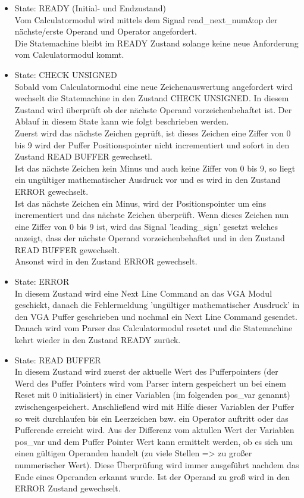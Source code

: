 \begin{itemize}

\item State: READY (Initial- und Endzustand) \\
Vom Calculatormodul wird mittels dem Signal read\_next\_num\&op der nächste/erste Operand und Operator angefordert. \\ 
Die Statemachine bleibt im READY Zustand solange keine neue Anforderung vom Calculatormodul kommt.

\item State: CHECK UNSIGNED \\
Sobald vom Calculatormodul eine neue Zeichenauswertung angefordert wird wechselt die Statemachine in den Zustand CHECK UNSIGNED. In diesem Zustand wird überprüft ob der nächste Operand vorzeichenbehaftet ist.
Der Ablauf in diesem State kann wie folgt beschrieben werden. \\
Zuerst wird das nächste Zeichen geprüft, ist dieses Zeichen eine Ziffer von 0 bis 9 wird der Puffer Positionspointer nicht incrementiert und sofort in den Zustand READ BUFFER gewechsetl. \\
Ist das nächste Zeichen kein Minus und auch keine Ziffer von 0 bis 9, so liegt ein ungültiger mathematischer Ausdruck vor und es wird in den Zustand ERROR gewechselt. \\
Ist das nächste Zeichen ein Minus, wird der Positionspointer um eins incrementiert und das nächste Zeichen überprüft. Wenn dieses Zeichen nun eine Ziffer von 0 bis 9 ist, wird das Signal 'leading\_sign' gesetzt welches anzeigt, dass der nächste Operand vorzeichenbehaftet und in den Zustand READ BUFFER gewechselt. \\
Ansonst wird in den Zustand ERROR gewechselt.

\item State: ERROR \\
In diesem Zustand wird eine Next Line Command an das VGA Modul geschickt, danach die Fehlermeldung 'ungültiger mathematischer Ausdruck' in den VGA Puffer geschrieben und nochmal ein Next Line Command gesendet.
Danach wird vom Parser das Calculatormodul resetet und die Statemachine kehrt wieder in den Zustand READY zurück.

\item State: READ BUFFER \\
In diesem Zustand wird zuerst der aktuelle Wert des Pufferpointers (der Werd des Puffer Pointers wird vom Parser intern gespeichert un bei einem Reset mit 0 initialisiert) in einer Variablen (im folgenden pos\_var genannt) zwischengespeichert. Anschließend wird mit Hilfe dieser Variablen der Puffer so weit durchlaufen bis ein Leerzeichen bzw. ein Operator auftritt oder das Pufferende erreicht wird. Aus der Differenz vom aktullen Wert der Variablen pos\_var und dem Puffer Pointer Wert kann ermittelt werden, ob es sich um einen gültigen Operanden handelt (zu viele Stellen => zu großer nummerischer Wert). Diese Überprüfung wird immer ausgeführt nachdem das Ende eines Operanden erkannt wurde. Ist der Operand zu groß wird in den ERROR Zustand gewechselt. 


\end{itemize}
